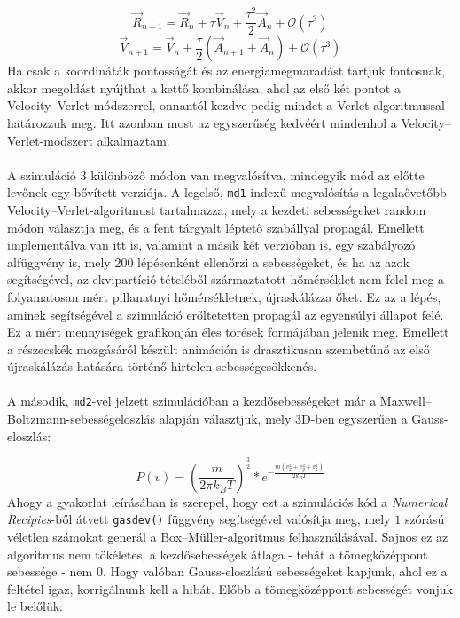 \begin{multicols}{2}
\begin{equation}
    \vec{R}_{n + 1}
    =
    \vec{R}_{n} + \tau \vec{V}_{n} + \frac{\tau^{2}}{2} \vec{A}_{n} + \mathscr{O} \left( \tau^{3} \right)
\end{equation}
\begin{equation}
    \vec{V}_{n + 1}
    =
    \vec{V}_{n} + \frac{\tau}{2} \left( \vec{A}_{n + 1} + \vec{A}_{n} \right) + \mathscr{O} \left( \tau^{3} \right)
\end{equation}
Ha csak a koordináták pontosságát és az energiamegmaradást tartjuk fontosnak, akkor megoldást nyújthat a kettő kombinálása, ahol az első két pontot a Velocity--Verlet-módszerrel, onnantól kezdve pedig mindet a Verlet-algoritmussal határozzuk meg. Itt azonban most az egyszerűség kedvéért mindenhol a Velocity--Verlet-módszert alkalmaztam.
\\ \\
A szimuláció 3 különböző módon van megvalósítva, mindegyik mód az előtte levőnek egy bővített verziója. A legelső, \texttt{md1} indexű megvalósítás a legalaővetőbb Velocity--Verlet-algoritmust tartalmazza, mely a kezdeti sebességeket random módon választja meg, és a fent tárgyalt léptető szabállyal propagál. Emellett implementálva van itt is, valamint a másik két verzióban is, egy szabályozó alfüggvény is, mely 200 lépésenként ellenőrzi a sebességeket, és ha az azok segítségével, az ekvipartíció tételéből származtatott hőmérséklet nem felel meg a folyamatosan mért pillanatnyi hőmérsékletnek, újraskálázza őket. Ez az a lépés, aminek segítségével a szimuláció erőltetetten propagál az egyensúlyi állapot felé. Ez a mért mennyiségek grafikonján éles törések formájában jelenik meg. Emellett a részecskék mozgásáról készült animáción is drasztikusan szembetűnő az első újraskálázás hatására történő hirtelen sebességcsökkenés\cite{yt}.
\\ \\
A második, \texttt{md2}-vel jelzett szimulációban a kezdősebességeket már a Maxwell--Boltzmann-sebességeloszlás alapján választjuk, mely 3D-ben egyszerűen a Gauss-eloszlás:

\begin{equation}
    P \left( v \right)
    =
    \left( \frac{m}{2 \pi k_{B} T} \right)^{\frac{3}{2}}
    *
    e^{- \tfrac{m \left( v_{x}^{2} + v_{y}^{2} + v_{z}^{2} \right)}{2 k_{B} T}}
\end{equation}
Ahogy a gyakorlat leírásában is szerepel\cite{szamszim}, hogy ezt a szimulációs kód a \textit{Numerical Recipies}-ből átvett \texttt{gasdev()} függvény segítségével valósítja meg, mely $1$ szórású véletlen számokat generál a Box--Müller-algoritmus felhasználásával\cite{press2007numerical}. Sajnos ez az algoritmus nem tökéletes, a kezdősebességek átlaga - tehát a tömegközéppont sebessége - nem 0. Hogy valóban Gauss-eloszlású sebességeket kapjunk, ahol ez a feltétel igaz, korrigálnunk kell a hibát. Előbb a tömegközéppont sebességét vonjuk le belőlük:


\end{multicols}
